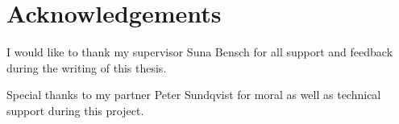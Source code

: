 \chapter*{Acknowledgements}

I would like to thank my supervisor Suna Bensch for all support and feedback during the writing of this thesis.

Special thanks to my partner Peter Sundqvist for moral as well as technical support during this project.

\cleardoublepage
 
